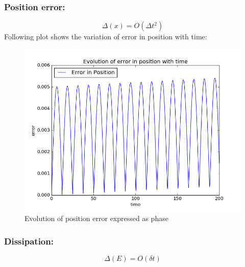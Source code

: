 \documentclass[11pt, a4paper]{article}
\begin{document}
\subsubsection{Position error:}
\begin{equation}
 \Delta (x) = O(\Delta t^{2})
\end{equation}
Following plot shows the variation of error in position with time:
\begin{figure}[H]
 \centering
 \includegraphics[scale = 0.5]{RK2_err_pos_1.png}
 \caption{Evolution of position error expressed as phase}
\end{figure}


\subsubsection{Dissipation:}
\begin{equation}
 \Delta (E) = O (\delta t)
\end{equation}
\end{document}
